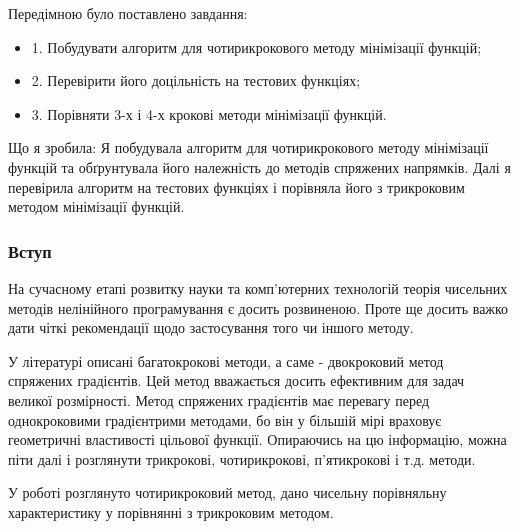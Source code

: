 \begin{frame}
\begin{alertblock}{Передімною було поставлено завдання:}
	\begin{itemize}
		\item 1. Побудувати алгоритм для чотирикрокового методу мінімізації функцій;
		\item 2. Перевірити його доцільність на тестових функціях;
		\item 3. Порівняти 3-х і 4-х крокові методи мінімізації функцій.
	\end{itemize}
\end{alertblock}
\begin{alertblock}{Що я зробила:}
	Я побудувала алгоритм для чотирикрокового методу мінімізації функцій та обґрунтувала його належність до методів спряжених напрямків. Далі я перевірила алгоритм на тестових функціях і порівняла його з трикроковим методом мінімізації функцій. 
\end{alertblock}
\end{frame}

\begin{frame}
\frametitle{Вступ} 
На сучасному етапі розвитку науки та комп'ютерних технологій теорія чисельних методів нелінійного програмування є досить розвиненою. Проте ще досить важко дати чіткі рекомендації щодо застосування того чи іншого методу.

У літературі описані багатокрокові методи, а саме - двокроковий метод спряжених градієнтів. Цей метод вважається досить ефективним для задач великої розмірності. Метод спряжених градієнтів має перевагу перед однокроковими градієнтрими методами, бо він у більшій мірі враховує геометричні властивості цільової функції. Опираючись на цю інформацію, можна піти далі і розглянути трикрокові, чотирикрокові, п'ятикрокові і т.д. методи.

У роботі розглянуто чотирикроковий метод, дано чисельну порівняльну характеристику у порівнянні з трикроковим методом.
\end{frame}

